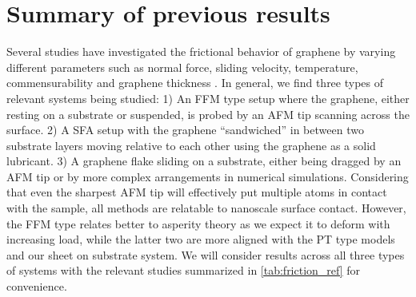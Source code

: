 



\section{Summary of previous results}\label{sec:prev_results}
Several studies have investigated the frictional behavior of graphene by varying
different parameters such as normal force, sliding velocity, temperature,
commensurability and graphene thickness \cite{penkov_tribology_2014}. In
general, we find three types of relevant systems being studied: 1) An
\acrshort{FFM} type setup where the graphene, either resting on a substrate or
suspended, is probed by an \acrshort{AFM} tip scanning across the surface. 2) A
\acrshort{SFA} setup with the graphene ``sandwiched'' in between two
substrate layers moving relative to each other using the graphene as a solid
lubricant. 3) A graphene flake sliding on a substrate, either being dragged by
an \acrshort{AFM} tip or by more complex arrangements in numerical simulations.
Considering that even the sharpest \acrshort{AFM} tip will effectively put
multiple atoms in contact with the sample, all methods are relatable to nanoscale surface contact. However, the \acrshort{FFM} type relates better to asperity theory as we expect it to deform with increasing load, while the latter two are more aligned with the \acrshort{PT} type models and our sheet on substrate system. We will consider results across all three types of systems with the relevant studies summarized in \cref{tab:friction_ref} for convenience. 


